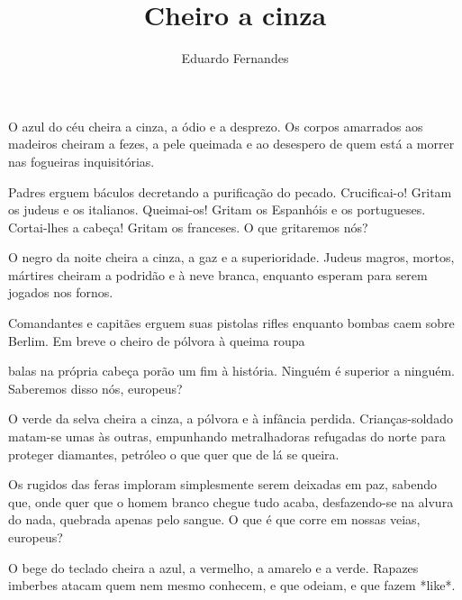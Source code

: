 \documentclass[12pt]{creativeWriting}
\title{Cheiro a cinza}
\author{Eduardo Fernandes}
\begin{document}
\maketitle

O azul do céu cheira a cinza, a ódio e a desprezo. Os corpos amarrados aos madeiros cheiram a fezes, a pele queimada e ao desespero de quem está a morrer nas fogueiras inquisitórias.

Padres erguem báculos decretando a purificação do pecado. Crucificai-o! Gritam os judeus e os italianos. Queimai-os! Gritam os Espanhóis e os portugueses. Cortai-lhes a cabeça! Gritam os franceses. O que gritaremos nós?
 
O negro da noite cheira a cinza, a gaz e a superioridade. Judeus magros, mortos, mártires cheiram a podridão e à neve branca, enquanto esperam para serem jogados nos fornos.

Comandantes e capitães erguem suas pistolas rifles enquanto bombas caem sobre Berlim. Em breve o cheiro de pólvora à queima roupa 

balas na própria cabeça porão um fim à história. Ninguém é superior a ninguém. Saberemos disso nós, europeus?

O verde da selva cheira a cinza, a pólvora e à infância perdida. Crianças-soldado matam-se umas às outras, empunhando metralhadoras refugadas do norte para proteger diamantes, petróleo o que quer que de lá se queira.

Os rugidos das feras imploram simplesmente serem deixadas em paz, sabendo que, onde quer que o homem branco chegue tudo acaba, desfazendo-se na alvura do nada, quebrada apenas pelo sangue. O que é que corre em nossas veias, europeus?

O bege do teclado cheira a azul, a vermelho, a amarelo e a verde. Rapazes imberbes atacam quem nem mesmo conhecem, e que odeiam, e que fazem *like*. 
\end{document}
